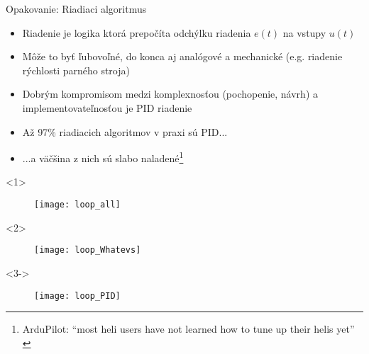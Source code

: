 \begin{frame}[t]{Opakovanie: Riadiaci algoritmus}
  \begin{itemize}
    \item<1-> Riadenie je logika ktorá prepočíta odchýlku riadenia $e(t)$ na vstupy $u(t)$
    \item<2-> Môže to byť ľubovoľné, do konca aj analógové a mechanické (e.g. riadenie rýchlosti parného stroja)
    \item<3-> Dobrým kompromisom medzi komplexnosťou (pochopenie, návrh) a implementovateľnosťou je PID riadenie
    \item<4-> Až 97\% riadiacich algoritmov v praxi sú PID... \citep{Murray2004}
    \item<5-> ...a väčšina z nich sú slabo naladené\footnote{ArduPilot: ``most heli users have not learned how to tune up their helis yet'' \citep{Hall2020}}
  \end{itemize}

\begin{onlyenv}<1>
\begin{figure}
\centering
  \texttt{[image: loop\_all]}\\
\end{figure}
\end{onlyenv}

\begin{onlyenv}<2>
\begin{figure}
\centering
  \texttt{[image: loop\_Whatevs]}\\
\end{figure}
\end{onlyenv}



\begin{onlyenv}<3->
\begin{figure}
\centering
  \texttt{[image: loop\_PID]}\\
\end{figure}
\end{onlyenv}
\end{frame}


